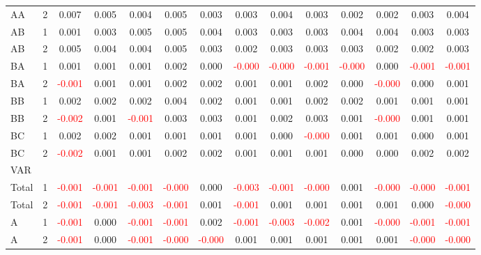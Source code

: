 \begin{table}[!htb]
{\begin{tabular}{llcccccccccccc}
AA & 2 & 0.007 & 0.005 & 0.004 & 0.005 & 0.003 & 0.003 & 0.004 & 0.003 & 0.002 & 0.002 & 0.003 & 0.004\\
AB & 1 & 0.001 & 0.003 & 0.005 & 0.005 & 0.004 & 0.003 & 0.003 & 0.003 & 0.004 & 0.004 & 0.003 & 0.003\\
AB & 2 & 0.005 & 0.004 & 0.004 & 0.005 & 0.003 & 0.002 & 0.003 & 0.003 & 0.003 & 0.002 & 0.002 & 0.003\\
BA & 1 & 0.001 & 0.001 & 0.001 & 0.002 & 0.000 & \textcolor{red}{-0.000} & \textcolor{red}{-0.000} & \textcolor{red}{-0.001} & \textcolor{red}{-0.000} & 0.000 & \textcolor{red}{-0.001} & \textcolor{red}{-0.001}\\
BA & 2 & \textcolor{red}{-0.001} & 0.001 & 0.001 & 0.002 & 0.002 & 0.001 & 0.001 & 0.002 & 0.000 & \textcolor{red}{-0.000} & 0.000 & 0.001\\
BB & 1 & 0.002 & 0.002 & 0.002 & 0.004 & 0.002 & 0.001 & 0.001 & 0.002 & 0.002 & 0.001 & 0.001 & 0.001\\
BB & 2 & \textcolor{red}{-0.002} & 0.001 & \textcolor{red}{-0.001} & 0.003 & 0.003 & 0.001 & 0.002 & 0.003 & 0.001 & \textcolor{red}{-0.000} & 0.001 & 0.001\\
BC & 1 & 0.002 & 0.002 & 0.001 & 0.001 & 0.001 & 0.001 & 0.000 & \textcolor{red}{-0.000} & 0.001 & 0.001 & 0.000 & 0.001\\
BC & 2 & \textcolor{red}{-0.002} & 0.001 & 0.001 & 0.002 & 0.002 & 0.001 & 0.001 & 0.001 & 0.000 & 0.000 & 0.002 & 0.002\\
\hline
VAR &  &  &  &  &  &  &  &  &  &  &  &  & \\
\hline
Total & 1 & \textcolor{red}{-0.001} & \textcolor{red}{-0.001} & \textcolor{red}{-0.001} & \textcolor{red}{-0.000} & 0.000 & \textcolor{red}{-0.003} & \textcolor{red}{-0.001} & \textcolor{red}{-0.000} & 0.001 & \textcolor{red}{-0.000} & \textcolor{red}{-0.000} & \textcolor{red}{-0.001}\\
Total & 2 & \textcolor{red}{-0.001} & \textcolor{red}{-0.001} & \textcolor{red}{-0.003} & \textcolor{red}{-0.001} & 0.001 & \textcolor{red}{-0.001} & 0.001 & 0.001 & 0.001 & 0.001 & 0.000 & \textcolor{red}{-0.000}\\
A & 1 & \textcolor{red}{-0.001} & 0.000 & \textcolor{red}{-0.001} & \textcolor{red}{-0.001} & 0.002 & \textcolor{red}{-0.001} & \textcolor{red}{-0.003} & \textcolor{red}{-0.002} & 0.001 & \textcolor{red}{-0.000} & \textcolor{red}{-0.001} & \textcolor{red}{-0.001}\\
A & 2 & \textcolor{red}{-0.001} & 0.000 & \textcolor{red}{-0.001} & \textcolor{red}{-0.000} & \textcolor{red}{-0.000} & 0.001 & 0.001 & 0.001 & 0.001 & 0.001 & \textcolor{red}{-0.000} & \textcolor{red}{-0.000}\\

\end{tabular}}
\end{table}
